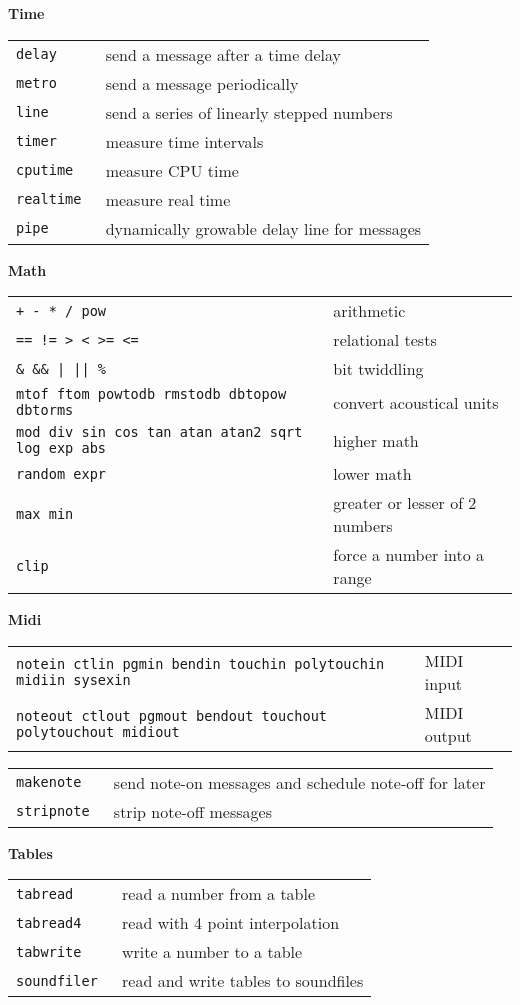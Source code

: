 \documentclass[a4paper, landscape, 10pt]{article}
\newcommand{\refcardtitle}[1]{
  \begin{center}
    \textbf{\small{#1}}
  \end{center}
}
\begin{document}
\begin{multicols}{3}
  \refcardtitle{Time}
  \begin{tabularx}{9cm}{>{\tt}l X}
    delay & send a message after a time delay \\
    metro & send a message periodically \\
    line & send a series of linearly stepped numbers \\
    timer & measure time intervals \\
    cputime & measure CPU time \\
    realtime & measure real time \\
    pipe & dynamically growable delay line for messages \\
  \end{tabularx}

  \refcardtitle{Math}
  \begin{tabularx}{9cm}{>{\tt}X X}
    + - * / pow  & arithmetic \\
    == != > < >= <= & relational tests \\
    \& \&\& | || \% & bit twiddling \\
    mtof ftom powtodb rmstodb dbtopow dbtorms & convert acoustical units \\
    mod div sin cos tan atan atan2 sqrt log exp abs & higher math \\
    random expr & lower math \\ 
    max min & greater or lesser of 2 numbers \\
    clip & force a number into a range \\
  \end{tabularx}

  \refcardtitle{Midi}
  \begin{tabularx}{9cm}{>{\tt}X l}
    notein ctlin pgmin bendin touchin polytouchin midiin sysexin & MIDI input \\
    noteout ctlout pgmout bendout touchout polytouchout midiout & MIDI output \\
  \end{tabularx}
  \begin{tabularx}{9cm}{>{\tt}l X}
    makenote & send note-on messages and schedule note-off for later \\
    stripnote & strip note-off messages \\
  \end{tabularx}

  \columnbreak
  \refcardtitle{Tables}
  \begin{tabularx}{9cm}{>{\tt}l X}
    tabread & read a number from a table \\
    tabread4 & read with 4 point interpolation \\
    tabwrite & write a number to a table \\
    soundfiler & read and write tables to soundfiles \\
  \end{tabularx}


\end{multicols}
\end{document}
